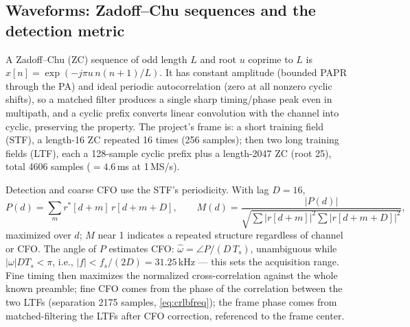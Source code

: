 \documentclass[10pt]{article}
\begin{document}
\subsection{Waveforms: Zadoff--Chu sequences and the detection metric}
A Zadoff--Chu (ZC) sequence of odd length $L$ and root $u$ coprime to $L$
is $x[n]=\exp(-j\pi u\,n(n{+}1)/L)$. It has constant amplitude (bounded
PAPR through the PA) and ideal periodic autocorrelation (zero at all
nonzero cyclic shifts), so a matched filter produces a single sharp
timing/phase peak even in multipath, and a cyclic prefix converts linear
convolution with the channel into cyclic, preserving the property. The
project's frame is: a short training field (STF), a length-16 ZC repeated
16 times (256 samples); then two long training fields (LTF), each a
128-sample cyclic prefix plus a length-2047 ZC (root 25), total 4606
samples ($=4.6$\,ms at 1\,MS/s).

Detection and coarse CFO use the STF's periodicity. With lag $D=16$,
\begin{equation}
P(d)=\sum_{m} r^*[d{+}m]\,r[d{+}m{+}D],\qquad
M(d)=\frac{|P(d)|}{\sqrt{\textstyle\sum|r[d{+}m]|^2\sum|r[d{+}m{+}D]|^2}} ,
\end{equation}
maximized over $d$; $M$ near 1 indicates a repeated structure regardless
of channel or CFO. The angle of $P$ estimates CFO:
$\hat\omega=\angle P/(D\,T_s)$, unambiguous while $|\omega|D T_s<\pi$,
i.e., $|f|<f_s/(2D)=31.25$\,kHz --- this sets the acquisition range.
Fine timing then maximizes the normalized cross-correlation against the
whole known preamble; fine CFO comes from the phase of the correlation
between the two LTFs (separation 2175 samples,
\eqref{eq:crlbfreq}); the frame phase comes from matched-filtering the
LTFs after CFO correction, referenced to the frame center.
\end{document}
